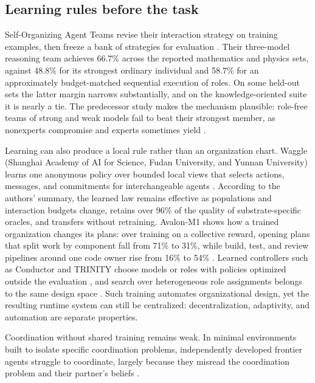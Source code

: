 \subsection{Learning rules before the task}
Self-Organizing Agent Teams revise their interaction strategy on training examples, then freeze a bank of strategies for evaluation \citep{sat-teams}. Their three-model reasoning team achieves 66.7\% across the reported mathematics and physics sets, against 48.8\% for its strongest ordinary individual and 58.7\% for an approximately budget-matched sequential execution of roles. On some held-out sets the latter margin narrows substantially, and on the knowledge-oriented suite it is nearly a tie. The predecessor study makes the mechanism plausible: role-free teams of strong and weak models fail to beat their strongest member, as nonexperts compromise and experts sometimes yield \citep{teams-hold-experts-back}.

Learning can also produce a local rule rather than an organization chart. Waggle (Shanghai Academy of AI for Science, Fudan University, and Yunnan University) learns one anonymous policy over bounded local views that selects actions, messages, and commitments for interchangeable agents \citep{waggle-2026}. According to the authors' summary, the learned law remains effective as populations and interaction budgets change, retains over 96\% of the quality of substrate-specific oracles, and transfers without retraining. Avalon-M1 shows how a trained organization changes its plans: over training on a collective reward, opening plans that split work by component fall from 71\% to 31\%, while build, test, and review pipelines around one code owner rise from 16\% to 54\% \citep{avalon-m1}. Learned controllers such as Conductor and TRINITY choose models or roles with policies optimized outside the evaluation \citep{sakana-conductor,sakana-trinity}, and search over heterogeneous role assignments belongs to the same design space \citep{heterogeneous-swarms}. Such training automates organizational design, yet the resulting runtime system can still be centralized: decentralization, adaptivity, and automation are separate properties.

Coordination without shared training remains weak. In minimal environments built to isolate specific coordination problems, independently developed frontier agents struggle to coordinate, largely because they misread the coordination problem and their partner's beliefs \citep{zero-shot-coordination-2026}.

